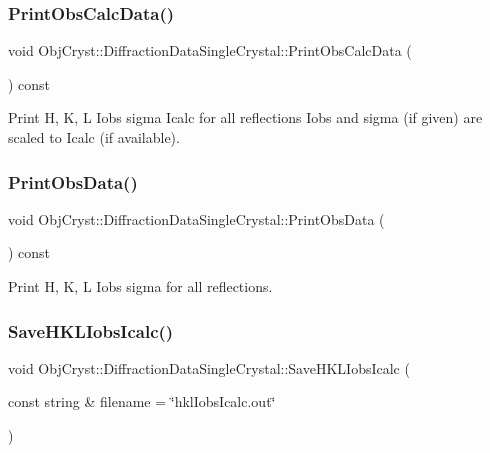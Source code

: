 \subsubsection{\texorpdfstring{PrintObsCalcData()}{PrintObsCalcData()}}
{\footnotesize\ttfamily void Obj\+Cryst\+::\+Diffraction\+Data\+Single\+Crystal\+::\+Print\+Obs\+Calc\+Data (\begin{DoxyParamCaption}{ }\end{DoxyParamCaption}) const\hspace{0.3cm}{\ttfamily [virtual]}}



Print H, K, L Iobs sigma Icalc for all reflections Iobs and sigma (if given) are scaled to Icalc (if available). 

\mbox{\label{class_obj_cryst_1_1_diffraction_data_single_crystal_abad3dcb258e1779a6c14cdc51b92f8c1}} 
\subsubsection{\texorpdfstring{PrintObsData()}{PrintObsData()}}
{\footnotesize\ttfamily void Obj\+Cryst\+::\+Diffraction\+Data\+Single\+Crystal\+::\+Print\+Obs\+Data (\begin{DoxyParamCaption}{ }\end{DoxyParamCaption}) const\hspace{0.3cm}{\ttfamily [virtual]}}



Print H, K, L Iobs sigma for all reflections. 

\mbox{\label{class_obj_cryst_1_1_diffraction_data_single_crystal_af220156c564b8d602b0c05ba222fba03}} 
\subsubsection{\texorpdfstring{SaveHKLIobsIcalc()}{SaveHKLIobsIcalc()}}
{\footnotesize\ttfamily void Obj\+Cryst\+::\+Diffraction\+Data\+Single\+Crystal\+::\+Save\+H\+K\+L\+Iobs\+Icalc (\begin{DoxyParamCaption}\item[{const string \&}]{filename = {\ttfamily \char`\"{}hklIobsIcalc.out\char`\"{}} }\end{DoxyParamCaption})}

